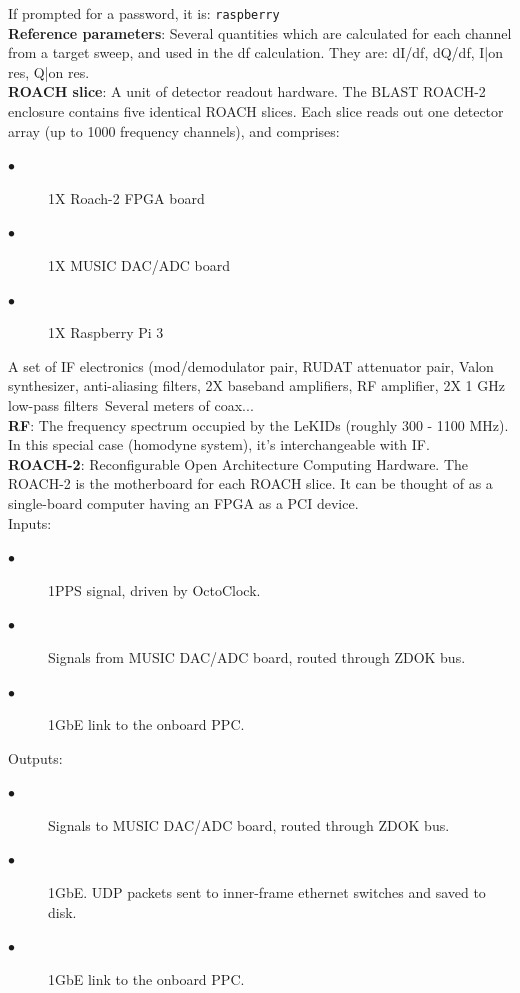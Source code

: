 If prompted for a password, it is: \texttt{raspberry}\\
\textbf{Reference parameters}: Several quantities which are calculated for each channel from a target sweep, and used in the df calculation. They are: dI/df, dQ/df, I|on res, Q|on res.\\
\textbf{ROACH slice}: A unit of detector readout hardware. The BLAST ROACH-2 enclosure contains five identical ROACH slices. Each slice reads out one detector array (up to 1000 frequency channels), and comprises:
\begin{description}
  \item[$\bullet$] 1X Roach-2 FPGA board
  \item[$\bullet$] 1X MUSIC DAC/ADC board
  \item[$\bullet$] 1X Raspberry Pi 3
\end{description}
A set of IF electronics (mod/demodulator pair, RUDAT attenuator pair, Valon synthesizer, anti-aliasing filters, 2X baseband amplifiers, RF amplifier, 2X 1 GHz low-pass filters\
Several meters of coax...\\
\textbf{RF}: The frequency spectrum occupied by the LeKIDs (roughly 300 - 1100 MHz). In this special case (homodyne system), it’s interchangeable with IF.\\
\textbf{ROACH-2}: Reconfigurable Open Architecture Computing Hardware. The ROACH-2 is the motherboard for each ROACH slice. It can be thought of as a single-board computer having an FPGA as a PCI device.\\
Inputs:
\begin{description}
  \item[$\bullet$] 1PPS signal, driven by OctoClock.
  \item[$\bullet$] Signals from MUSIC DAC/ADC board, routed through ZDOK bus.
  \item[$\bullet$] 1GbE link to the onboard PPC.
\end{description}
Outputs:
\begin{description}
  \item[$\bullet$] Signals to MUSIC DAC/ADC board, routed through ZDOK bus.
  \item[$\bullet$] 1GbE. UDP packets sent to inner-frame ethernet switches and saved to disk.
  \item[$\bullet$] 1GbE link to the onboard PPC.
\end{description}
